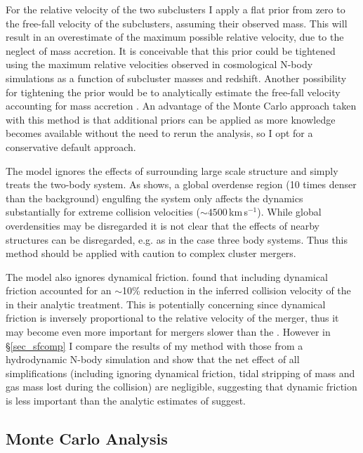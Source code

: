 For the relative velocity of the two subclusters I apply a flat prior from zero to the free-fall velocity of the subclusters, assuming their observed mass.
This will result in an overestimate of the maximum possible relative velocity, due to the neglect of mass accretion.
It is conceivable that this prior could be tightened using the maximum relative velocities observed in cosmological N-body simulations as a function of subcluster masses and redshift. 
Another possibility for tightening the prior would be to analytically estimate the free-fall velocity accounting for mass accretion \citep[e.g.][]{Angus:2007em}.
An advantage of the Monte Carlo approach taken with this method is that additional priors can be applied as more knowledge becomes available without the need to rerun the analysis, so I opt for a conservative default approach.

The model ignores the effects of surrounding large scale structure and simply treats the two-body system.
As \citet{Nusser:2008iw} shows, a global overdense region (10 times denser than the background) engulfing the system only affects the dynamics substantially for extreme collision velocities ($\sim 4500$\,km\,s$^{-1}$).  While global overdensities may be disregarded it is not clear that the effects of nearby structures can be disregarded, e.g. as in the case three body systems.  Thus this method should be applied with caution to complex cluster mergers.

The model also ignores dynamical friction.
\citet{Farrar:2007fc} found that including dynamical friction accounted for an $\sim$10\% reduction in the inferred collision velocity of the  in their analytic treatment.
This is potentially concerning since dynamical friction is inversely proportional to the relative velocity of the merger, thus it may become even more important for mergers slower than the .
However in \S \ref{sec_sfcomp} I compare the results of my method with those from a hydrodynamic N-body simulation and show that the net effect of all simplifications (including ignoring dynamical friction, tidal stripping of mass and gas mass lost during the collision) are negligible, suggesting that dynamic friction is less important than the analytic estimates of \citet{Farrar:2007fc} suggest.
 

\subsection{Monte Carlo Analysis}\label{sec_MCanalysis}

